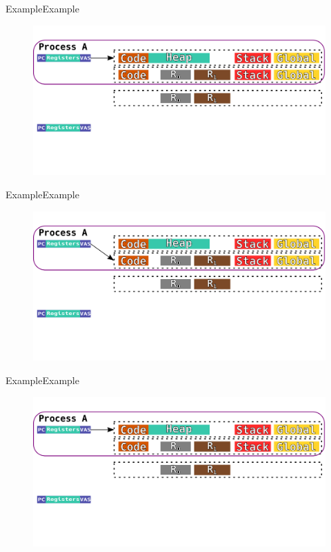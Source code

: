 \documentclass[10pt]{beamer}
\begin{document}
\begin{frame}{Example}{Example}
  \begin{figure}[ht]
    \centering
    \includegraphics[width=1\textwidth, keepaspectratio=true]{images/spacejmp_example_f.png}
  \end{figure}
\end{frame}

\begin{frame}{Example}{Example}
  \begin{figure}[ht]
    \centering
    \includegraphics[width=1\textwidth, keepaspectratio=true]{images/spacejmp_example_g.png}
  \end{figure}
\end{frame}

\begin{frame}{Example}{Example}
  \begin{figure}[ht]
    \centering
    \includegraphics[width=1\textwidth, keepaspectratio=true]{images/spacejmp_example_f.png}
  \end{figure}
\end{frame}
\end{document}
